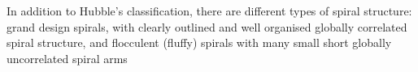 \documentclass[letterpaper,landscape]{slides}
\begin{document}
\begin{slide}
\begin{center}
\vskip -0.1in
\end{center}

\begin{center}
\vskip -0.3in

In addition to Hubble's classification, there are different types of 
spiral structure: {\color{blue} grand design} spirals, with clearly outlined 
and well organised {\color{red} globally correlated} spiral structure, and 
{\color{blue} flocculent} (fluffy) spirals with many small short {\color{red} 
globally uncorrelated} spiral arms

\end{center}

\vfill
\end{slide}

\end{document}
